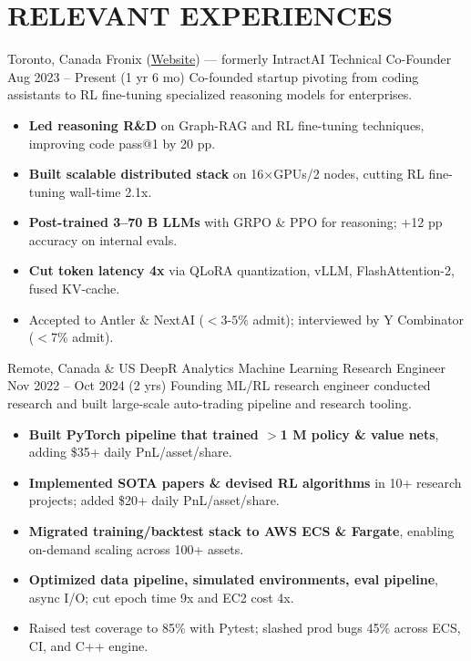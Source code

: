 \section{RELEVANT EXPERIENCES}

{\customcventry
    {Toronto, Canada}
    {Fronix (\href{https://fronix.net}{Website}) — formerly IntractAI}
    {Technical Co-Founder}
    {Aug 2023 – Present (1 yr 6 mo)}{}{}}
    Co-founded startup pivoting from coding assistants to RL fine-tuning specialized reasoning models for enterprises.
    \begin{itemize}
        \item \textbf{Led reasoning R\&D} on Graph-RAG and RL fine-tuning techniques, improving code pass@1 by 20 pp.
        \item \textbf{Built scalable distributed stack} on 16×GPUs/2 nodes, cutting RL fine-tuning wall-time 2.1x.
        \item \textbf{Post-trained 3–70 B LLMs} with GRPO \& PPO for reasoning; +12 pp accuracy on internal evals.
        \item \textbf{Cut token latency 4x} via QLoRA quantization, vLLM, FlashAttention-2, fused KV-cache.
        \item Accepted to Antler \& NextAI ($<$$3$-$5\%$ admit); interviewed by Y Combinator ($<$$7\%$ admit).
    \end{itemize}


{\customcventry
    {Remote, Canada \& US}
    {DeepR Analytics}
    {Machine Learning Research Engineer}
    {Nov 2022 – Oct 2024 (2 yrs)}{}{}}
    Founding ML/RL research engineer conducted research and built large-scale auto-trading pipeline and research tooling.
    \begin{itemize}
        \item \textbf{Built PyTorch pipeline that trained $>$1 M policy \& value nets}, adding \$35+ daily PnL/asset/share.
        \item \textbf{Implemented SOTA papers \& devised RL algorithms} in 10+ research projects; added \$20+ daily PnL/asset/share.
        \item \textbf{Migrated training/backtest stack to AWS ECS \& Fargate}, enabling on-demand scaling across 100+ assets.
        \item \textbf{Optimized data pipeline, simulated environments, eval pipeline}, async I/O; cut epoch time 9x and EC2 cost 4x.
        \item Raised test coverage to 85\% with Pytest; slashed prod bugs 45\% across ECS, CI, and C++ engine.
    \end{itemize}
  

